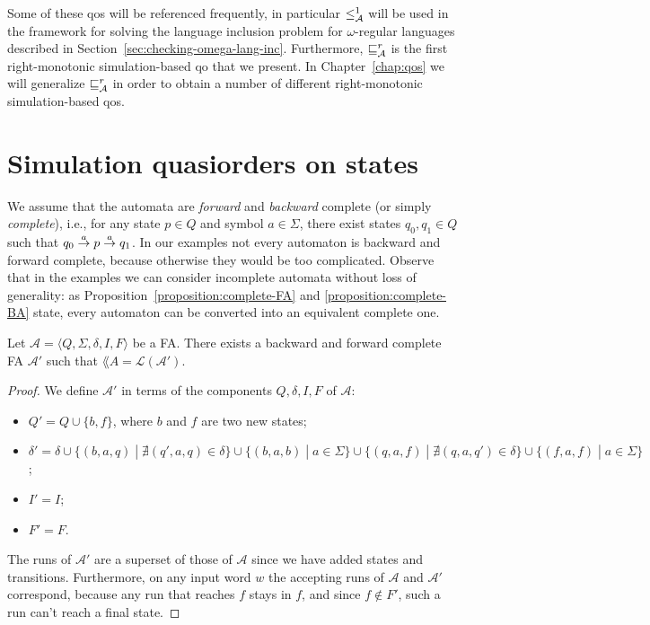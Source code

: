 Some of these qos will be referenced frequently, in particular $\leq^1_{\mathcal{A}}$ will be used
in the framework for solving the language inclusion problem for $\omega$-regular
languages described in Section~\ref{sec:checking-omega-lang-inc}.
Furthermore, $\sqsubseteq_{\mathcal{A}}^r$ is the first right-monotonic simulation-based qo
that we present.
In Chapter~\ref{chap:qos} we will generalize $\sqsubseteq_{\mathcal{A}}^r$ in order
to obtain a number of different right-monotonic simulation-based qos.

\section{Simulation quasiorders on states}
\label{sec:simulation}

We assume that the automata are
\emph{forward} and \emph{backward} complete (or simply \emph{complete}),
i.e., for any state $p \in Q$
and symbol $a \in \Sigma$, there exist states $q_0,q_1 \in Q$ such that
$q_0 \overset{a}{\rightarrow} p \overset{a}{\rightarrow} q_1$.
In our examples not every automaton is backward and forward complete,
because otherwise they would be too complicated.
Observe that in the examples we can consider incomplete automata without loss
of generality:
as Proposition~\ref{proposition:complete-FA} and \ref{proposition:complete-BA} state,
every automaton can be converted into an equivalent complete one.

\begin{proposition}
\label{proposition:complete-FA}
Let $\mathcal{A} = \langle Q, \Sigma, \delta, I, F\rangle$ be a FA.
There exists a backward and forward complete FA $\mathcal{A}'$ such that
$\lang{A} = \mathcal{L}(\mathcal{A}')$.
\end{proposition}

\begin{proof}
We define $\mathcal{A}'$ in terms of the components $Q, \delta, I, F$ of $\mathcal{A}$:
\begin{itemize}
\item $Q' = Q \cup \{b, f\}$, where $b$ and $f$ are two new states;
\item $\delta' = \delta \cup \{(b,a,q) \;|\; \nexists (q', a, q) \in \delta\} \cup
\{(b, a, b) \;|\; a \in \Sigma \}\cup \{(q,a,f) \;|\; \nexists (q,a,q') \in \delta\}
\cup \{(f,a,f) \;|\; a \in \Sigma\}$;
\item $I' = I$;
\item $F' = F$.
\end{itemize}
The runs of $\mathcal{A}'$ are a superset of those of $\mathcal{A}$ since we
have added states and transitions.
Furthermore, on any input word $w$ the accepting runs of $\mathcal{A}$
and $\mathcal{A}'$ correspond, because any run that reaches $f$ stays in $f$,
and since $f \notin F'$, such a run can't reach a final state.
\end{proof}

